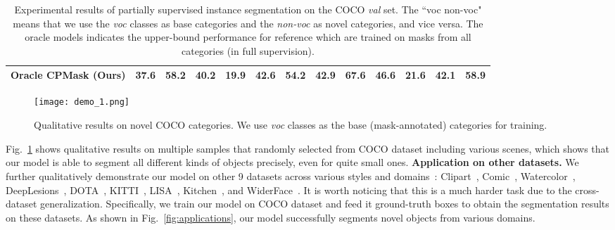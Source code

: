 \documentclass[runningheads]{llncs}
\begin{document}
\begin{table}[!t]
\begin{center}
{{\begin{tabular}{c|cccccc|cccccc}
					Oracle CPMask (Ours)   & {\color{gray}37.6} & {\color{gray}58.2} & {\color{gray}40.2} & {\color{gray}19.9} & {\color{gray}42.6} & {\color{gray}54.2} & {\color{gray}42.9} & {\color{gray}67.6} & {\color{gray}46.6}          &    {\color{gray}21.6}      & {\color{gray}42.1} & {\color{gray}58.9} \\
					\hline
		\end{tabular}}}
	\end{center}
	\vspace{-0.1in}
	\caption{Experimental results of partially supervised instance segmentation on the COCO {\it val} set. The ``voc  non-voc" means that we use the \emph{voc} classes as base categories and the \emph{non-voc} as novel categories, and vice versa. The oracle models indicates the upper-bound performance for reference which are trained on masks from all categories (in full supervision).} \label{table:partially}
	\vspace{-0.23in}
\end{table}

 \begin{figure}[!t]
 	\centering
\texttt{[image: demo\_1.png]}
 	\vspace{-0.1in}
 	\caption{Qualitative results on novel COCO categories. We use \emph{voc} classes as the base (mask-annotated) categories for training. }
 	\label{fig:coco}
 	\vspace{-0.3in}
 \end{figure}

 Fig.~\ref{fig:coco} shows qualitative results on multiple samples that randomly selected from COCO dataset including various scenes, which shows that our model is able to segment all different kinds of objects precisely, even for quite small ones. 
\noindent\textbf{Application on other datasets.} We further qualitatively demonstrate our model on other 9 datasets across various styles and domains~\cite{wang2019towards}:  Clipart~\cite{inoue2018cross}, Comic~\cite{inoue2018cross}, Watercolor~\cite{inoue2018cross},  DeepLesions~\cite{yan2018deep}, DOTA~\cite{xia2018dota},  KITTI~\cite{geiger2012we}, LISA~\cite{mogelmose2012vision}, Kitchen~\cite{georgakis2016multiview}, and WiderFace~\cite{yang2016wider}. It is worth noticing that this is a much harder task due to the cross-dataset generalization. Specifically, we train our model on COCO dataset and feed it ground-truth boxes to obtain the segmentation results on these datasets. As shown in Fig.~\ref{fig:applications}, our model successfully segments novel objects from various domains. 
\end{document}
